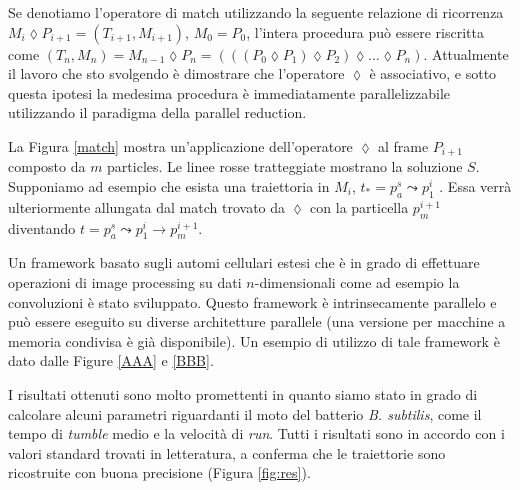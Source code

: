 \documentclass[a4paper,11pt]{paper}
\begin{document}
Se denotiamo  l'operatore di match utilizzando la seguente relazione di ricorrenza $  M_i \lozenge P_{i+1} = (T_{i+1},M_{i+1}) $, $M_0=P_0$, l'intera procedura può essere riscritta come $(T_n,M_n) = M_{n-1} \lozenge P_{n}=(((P_0 \lozenge P_1)\lozenge P_2) \lozenge \ldots \lozenge P_n)$.
Attualmente il lavoro che sto svolgendo è dimostrare che l'operatore $\lozenge $ è associativo, e sotto questa ipotesi la medesima procedura è immediatamente parallelizzabile utilizzando il paradigma della parallel reduction.

La Figura \ref{match} mostra un'applicazione dell'operatore $\lozenge$ al frame $P_{i+1}$ composto da $m$ particles. Le linee rosse tratteggiate mostrano la soluzione $S$.
Supponiamo ad esempio che esista una traiettoria in $M_i$, $t_*=p^s_a \leadsto p^i_1$ . Essa verrà ulteriormente allungata dal match trovato da $\lozenge$ con la particella $p^{i+1}_m$ diventando $t=p^s_a \leadsto p^i_1 \to p^{i+1}_m$.

Un framework basato sugli automi cellulari estesi che è in grado di effettuare operazioni di image processing su dati $n$-dimensionali come ad esempio la convoluzioni è stato sviluppato. Questo framework è intrinsecamente parallelo e può essere eseguito su diverse architetture parallele (una versione per macchine a memoria condivisa è già disponibile). Un esempio di utilizzo di tale framework è dato dalle Figure \ref{AAA} e \ref{BBB}.

I risultati ottenuti sono molto promettenti in quanto siamo stato in grado di calcolare alcuni parametri riguardanti il moto del batterio \textit{B. subtilis}, come il tempo di \textit{tumble} medio e la velocità di \textit{run}. 
Tutti i risultati sono in accordo con i valori standard trovati in letteratura, a conferma che le traiettorie sono ricostruite con buona precisione (Figura \ref{fig:res}).
\end{document}
